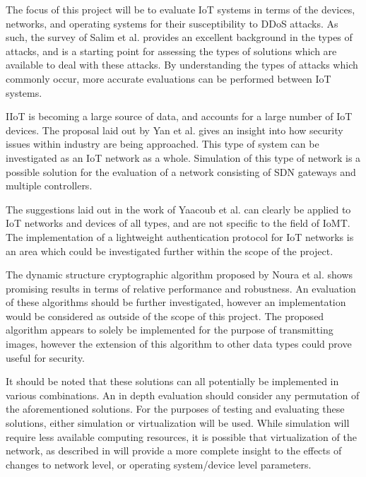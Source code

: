The focus of this project will be to evaluate IoT systems in terms of the
devices, networks, and operating systems for their susceptibility to DDoS
attacks. As such, the survey of Salim et al.\cite{Salim2019} provides an
excellent background in the types of attacks, and is a starting point for
assessing the types of solutions which are available to deal with these attacks.
By understanding the types of attacks which commonly occur, more accurate
evaluations can be performed between IoT systems.

IIoT is becoming a large source of data, and accounts for a large number of IoT
devices. The proposal laid out by Yan et al.\cite{iiot_2019} gives an insight
into how security issues within industry are being approached. This type of
system can be investigated as an IoT network as a whole. Simulation of this type
of network is a possible solution for the evaluation of a network consisting of
SDN gateways and multiple controllers.

The suggestions laid out in the work of Yaacoub et al.\cite{iomt_2019} can
clearly be applied to IoT networks and devices of all types, and are not
specific to the field of IoMT. The implementation of a lightweight
authentication protocol for IoT networks is an area which could be investigated
further within the scope of the project.

The dynamic structure cryptographic algorithm proposed by Noura et
al.\cite{iotalgorithm} shows promising results in terms of relative performance
and robustness. An evaluation of these algorithms should be further investigated,
however an implementation would be considered as outside of the scope of this
project. The proposed algorithm appears to solely be implemented
for the purpose of transmitting images, however the extension of this algorithm
to other data types could prove useful for security.

It should be noted that these solutions can all potentially be implemented in
various combinations. An in depth evaluation should consider any permutation of
the aforementioned solutions. For the purposes of testing and evaluating these
solutions, either simulation or virtualization will be used. While simulation
will require less available computing resources, it is possible that
virtualization of the network, as described in \cite{iiot_2019} will provide a
more complete insight to the effects of changes to network level, or operating
system/device level parameters.
